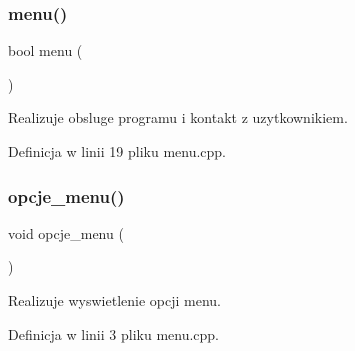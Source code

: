 \subsubsection{\texorpdfstring{menu()}{menu()}}
{\footnotesize\ttfamily bool menu (\begin{DoxyParamCaption}{ }\end{DoxyParamCaption})}



Realizuje obsluge programu i kontakt z uzytkownikiem. 



Definicja w linii 19 pliku menu.\+cpp.

\mbox{\label{menu_8hh_a882986fc86f906fa55f5f57e364dc748}} 
\subsubsection{\texorpdfstring{opcje\+\_\+menu()}{opcje\_menu()}}
{\footnotesize\ttfamily void opcje\+\_\+menu (\begin{DoxyParamCaption}{ }\end{DoxyParamCaption})}



Realizuje wyswietlenie opcji menu. 



Definicja w linii 3 pliku menu.\+cpp.


